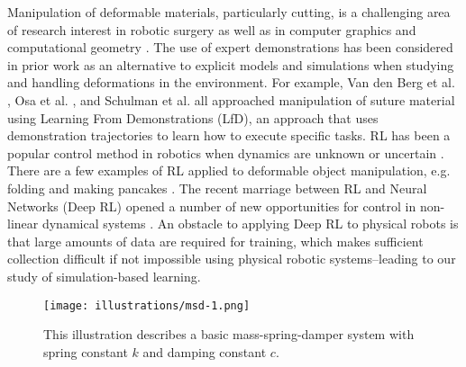 Manipulation of deformable materials, particularly cutting, is a challenging area of research interest in robotic surgery \cite{nienhuys2001surgery, murali2015learning} as well as in computer graphics and computational geometry \cite{zhang2004cutting,Chentanez2009}. The use of expert demonstrations has been considered in prior work as an alternative to explicit models and simulations when studying and handling deformations in the environment. For example, Van den Berg et al. \cite{vandenBerg2010}, Osa et al. \cite{Osa2014}, and Schulman et al. \cite{Schulman2013} all approached manipulation of suture material using Learning From Demonstrations (LfD), an approach that uses demonstration trajectories to learn how to execute specific tasks.
RL has been a popular control method in robotics when dynamics are unknown or uncertain \cite{kober2013reinforcement}.
There are a few examples of RL applied to deformable object manipulation, e.g. folding \cite{balaguer2011combining} and making pancakes \cite{beetz2011robotic}.
The recent marriage between RL and Neural Networks (Deep RL)  opened a number of new opportunities for control in non-linear dynamical systems \cite{levine2015end}.
An obstacle to applying Deep RL to physical robots is that large amounts  of data are required for training, which makes sufficient collection difficult if not impossible using physical robotic systems--leading to our study of simulation-based learning.

\begin{figure}[t]
\centering
\texttt{[image: illustrations/msd-1.png]}
\caption{This illustration describes a basic mass-spring-damper system with spring constant $k$ and damping constant $c$. \label{illus:1}}
\end{figure}

